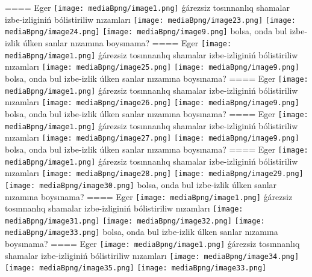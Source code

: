 ====
Eger \texttt{[image: mediaBpng/image1.png]} ǵárezsiz tosınnanlıq shamalar izbe-izliginiń bólistiriliw nızamları
\texttt{[image: mediaBpng/image23.png]} \texttt{[image: mediaBpng/image24.png]} \texttt{[image: mediaBpng/image9.png]}
bolsa, onda bul izbe-izlik úlken sanlar nızamına boysınama?
====
Eger \texttt{[image: mediaBpng/image1.png]} ǵárezsiz tosınnanlıq shamalar izbe-izliginiń bólistiriliw nızamları
\texttt{[image: mediaBpng/image25.png]} \texttt{[image: mediaBpng/image9.png]}
bolsa, onda bul izbe-izlik úlken sanlar nızamına boysınama?
====
Eger \texttt{[image: mediaBpng/image1.png]} ǵárezsiz tosınnanlıq shamalar izbe-izliginiń bólistiriliw nızamları
\texttt{[image: mediaBpng/image26.png]} \texttt{[image: mediaBpng/image9.png]}
bolsa, onda bul izbe-izlik úlken sanlar nızamına boysınama?
====
Eger \texttt{[image: mediaBpng/image1.png]} ǵárezsiz tosınnanlıq shamalar izbe-izliginiń bólistiriliw nızamları
\texttt{[image: mediaBpng/image27.png]} \texttt{[image: mediaBpng/image9.png]}
bolsa, onda bul izbe-izlik úlken sanlar nızamına boysınama?
====
Eger \texttt{[image: mediaBpng/image1.png]} ǵárezsiz tosınnanlıq shamalar izbe-izliginiń bólistiriliw nızamları
\texttt{[image: mediaBpng/image28.png]} \texttt{[image: mediaBpng/image29.png]} \texttt{[image: mediaBpng/image30.png]}
bolsa, onda bul izbe-izlik úlken sanlar nızamına boysınama?
====
Eger \texttt{[image: mediaBpng/image1.png]} ǵárezsiz tosınnanlıq shamalar izbe-izliginiń bólistiriliw nızamları
\texttt{[image: mediaBpng/image31.png]} \texttt{[image: mediaBpng/image32.png]} \texttt{[image: mediaBpng/image33.png]}
bolsa, onda bul izbe-izlik úlken sanlar nızamına boysınama?
====
Eger \texttt{[image: mediaBpng/image1.png]} ǵárezsiz tosınnanlıq shamalar izbe-izliginiń bólistiriliw nızamları
\texttt{[image: mediaBpng/image34.png]} \texttt{[image: mediaBpng/image35.png]} \texttt{[image: mediaBpng/image33.png]}
